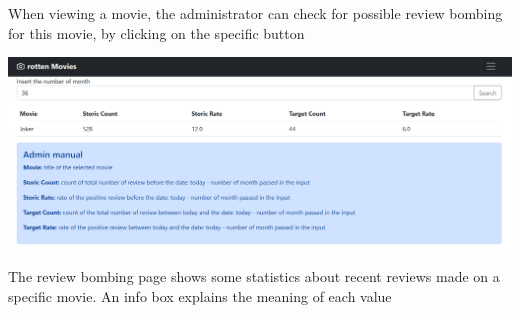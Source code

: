 When viewing a movie, the administrator can check for possible review bombing for this movie, by clicking on the specific button

\includegraphics[scale=0.45]{../../../images/user_manual/review_bombing_page.png} 

The review bombing page shows some statistics about recent reviews made on a specific movie. An info box explains the meaning of each value



